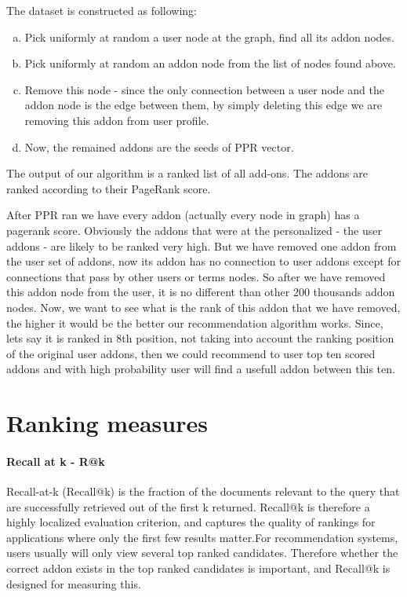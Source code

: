 \documentclass[11pt,oneside]{book}
\let\Oldsection\section
\renewcommand{\section}{\FloatBarrier\Oldsection}
\begin{document}
The dataset is constructed as following:\\

\begin{enumerate}[(a)]
\item Pick uniformly at random a user node at the graph, find all its addon nodes.
\item Pick uniformly at random an addon node from the list of nodes found above.
\item Remove this node - since the only connection between a user node and the addon node is the edge between them, by simply deleting this edge we are removing this addon from user profile.
\item Now, the remained addons are the seeds of PPR vector.
\end{enumerate}

The output of our algorithm is a ranked list of all add-ons. The addons are ranked according to their PageRank score.

After PPR ran we have every addon (actually every node in graph) has a pagerank score. Obviously the addons that were at the personalized - the user addons - are likely to be ranked very high. But we have removed one addon from the user set of addons, now its addon has no connection to user addons except for connections that pass by other users or terms nodes. So after we have removed this addon node from the user, it is no different than other 200 thousands addon nodes. Now, we want to see what is the rank of this addon that we have removed, the higher it would be the better our recommendation algorithm works. Since, lets say it is ranked in 8th position, not taking into account the ranking position of the original user addons, then we could recommend to user top ten scored addons and with high probability user will find a usefull addon between this ten.\\

\section{Ranking measures}
\label{sec:ranking}
\paragraph{Recall at k - R@k}
Recall-at-k (Recall@k) is the fraction of the documents relevant to the query that are successfully retrieved out of the first k returned. Recall@k is therefore a highly localized evaluation criterion, and captures the quality of rankings for applications where only the first
few results matter.For recommendation systems, users usually will only view several top ranked candidates. Therefore whether
the correct addon exists in the top ranked candidates is important, and Recall@k is designed for measuring this.
\end{document}
